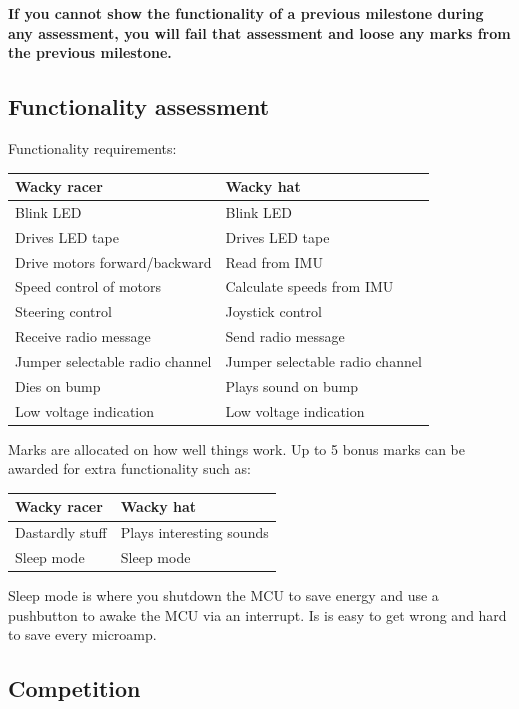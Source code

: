 \documentclass[11pt, a4paper]{article}
\begin{document}
\textbf{If you cannot show the functionality of a previous milestone
  during any assessment, you will fail that assessment and loose any
  marks from the previous milestone.}


\subsection{Functionality assessment}

Functionality requirements:
%
\begin{flushleft}
  \begin{tabular}{l|l}
    Wacky racer & Wacky hat \\ \hline \hline
    Blink LED                      & Blink LED \\
    Drives LED tape                & Drives LED tape \\
    Drive motors forward/backward  & Read from IMU \\
    Speed control of motors        & Calculate speeds from IMU \\
    Steering control               & Joystick control \\
    Receive radio message          & Send radio message \\
    Jumper selectable radio channel & Jumper selectable radio channel  \\
    Dies on bump                   & Plays sound on bump \\
    Low voltage indication         & Low voltage indication \\
  \end{tabular}
\end{flushleft}
%
Marks are allocated on how well things work.  Up to 5 bonus marks can
be awarded for extra functionality such as:
%
\begin{flushleft}
  \begin{tabular}{l|l}
    Wacky racer                & Wacky hat \\ \hline \hline
    Dastardly stuff            & Plays interesting sounds \\
    Sleep mode                 & Sleep mode \\
  \end{tabular}
\end{flushleft}

Sleep mode is where you shutdown the MCU to save energy and use a
pushbutton to awake the MCU via an interrupt.  Is is easy to get wrong
and hard to save every microamp.

\subsection{Competition}
\end{document}
